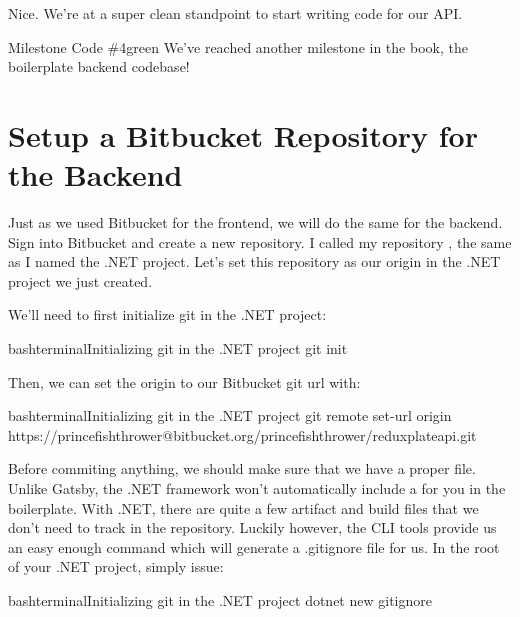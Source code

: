 \documentclass[paper=6in:9in,pagesize=pdftex,headinclude=on,footinclude=on,12pt,twoside]{scrbook}
\begin{document}
Nice. We're at a super clean standpoint to start writing code for our API.

\begin{highlightBox}{Milestone Code \#4}{green}{\greenCheck}
We've reached another milestone in the book, the boilerplate backend codebase!
\end{highlightBox}

\section{Setup a Bitbucket Repository for the Backend}


Just as we used Bitbucket for the frontend, we will do the same for the backend. Sign into Bitbucket and create a new repository. I called my repository , the same as I named the .NET project. Let's set this repository as our origin in the .NET project we just created.


We'll need to first initialize git in the .NET project:

\begin{codeInput}{bash}{terminal}{Initializing git in the .NET project}
git init
\end{codeInput}

Then, we can set the origin to our Bitbucket git url with:

\begin{codeInput}{bash}{terminal}{Initializing git in the .NET project}
git remote set-url origin https://princefishthrower@bitbucket.org/princefishthrower/reduxplateapi.git
\end{codeInput}


Before commiting anything, we should make sure that we have a proper  file. Unlike Gatsby, the .NET framework won't automatically include a  for you in the boilerplate. With .NET, there are quite a few artifact and build files that we don't need to track in the repository. Luckily however, the  CLI tools provide us an easy enough command which will generate a .gitignore file for us. In the root of your .NET project, simply issue:

\begin{codeInput}{bash}{terminal}{Initializing git in the .NET project}
dotnet new gitignore
\end{codeInput}
\end{document}
